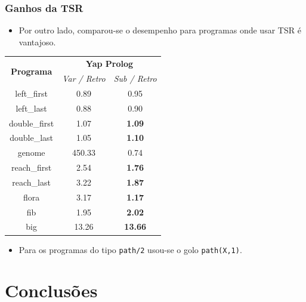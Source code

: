 \documentclass{beamer}
\begin{document}
\begin{frame}
   \frametitle{Ganhos da TSR}
   
   \begin{itemize}
      \item Por outro lado, comparou-se o desempenho para programas onde usar TSR é vantajoso.
   \end{itemize}
   \pause
   \begin{center}
   {\footnotesize
     \begin{tabular}{ccc}
      \hline
       \hline
       \multirow{2}{*}{\textbf{Programa}} & \multicolumn{2}{c}{\textbf{Yap Prolog}} \\
       & \textit{\small{Var / Retro}} & \textit{\small{Sub / Retro}} \\
      \hline
      \hline
   left\_first & 0.89 & 0.95 \\
   left\_last & 0.88  & 0.90 \\
   double\_first & 1.07 & \textbf{1.09} \\
   double\_last & 1.05 & \textbf{1.10} \\
   genome & 450.33 & 0.74 \\
   reach\_first  & 2.54 & \textbf{1.76} \\
   reach\_last  & 3.22 & \textbf{1.87} \\
   flora & 3.17 & \textbf{1.17} \\
   fib & 1.95 & \textbf{2.02} \\
   big & 13.26 & \textbf{13.66} \\
   \hline
   \hline
   \end{tabular}}
   \end{center}
   \begin{itemize}
      \item Para os programas do tipo \texttt{path/2} usou-se o golo \texttt{path(X,1)}.
   \end{itemize}
\end{frame}

\section{Conclusões}
\end{document}
